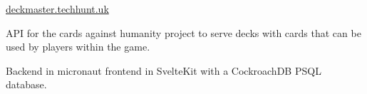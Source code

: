 \cventry
    {\href{https://deckmaster.techhunt.uk}{deckmaster.techhunt.uk}} %
    {} %
    {} %
    {} %
    {\begin{cvitems}
        \item{API for the cards against humanity project to serve decks with cards that can be used by players within the game.}
        \item{Backend in micronaut frontend in SvelteKit with a CockroachDB PSQL database.}
    \end{cvitems}}